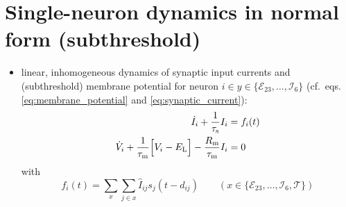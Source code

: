 \documentclass[10pt,a4paper,twoside,american]{article}
\theoremstyle{definitionstyle}
\newcommand{\RM}{R_\text{m}}
\newcommand{\tauM}{\tau_\text{m}}
\newcommand{\tauS}{\tau_\text{s}}
\begin{document}
\clearpage
\appendix
\section{Single-neuron dynamics in normal form (subthreshold)}
\label{sec:normal_form}
\begin{itemize}
\item linear, inhomogeneous dynamics of synaptic input currents and (subthreshold) membrane potential for neuron $i \in y\in\{\mathcal{E}_{23},\ldots,\mathcal{I}_{6}\}$ (cf.~eqs.\,\eqref{eq:membrane_potential} and \eqref{eq:synaptic_current}):
  \begin{equation}
    \label{eq:1st_order_ode}
    \begin{aligned}
      \dot{I}_{i} + \frac{1}{\tauS} I_{i} &= f_{i}(t)\\
      \dot{V}_{i} + \frac{1}{\tauM} \Bigl[ V_{i}-E_\text{L}\Bigr] - \frac{\RM}{\tauM} I_{i} &= 0
    \end{aligned}
  \end{equation}
  with
  \begin{equation}
	  f_{i}(t)=\sum_{x}\sum_{j\in x} \hat{I}_{ij} s_{j}(t-d_{ij})
    \qquad(x\in\{\mathcal{E}_{23},\ldots,\mathcal{I}_{6}, \mathcal{T}\})
  \end{equation}


\end{itemize}
\end{document}
